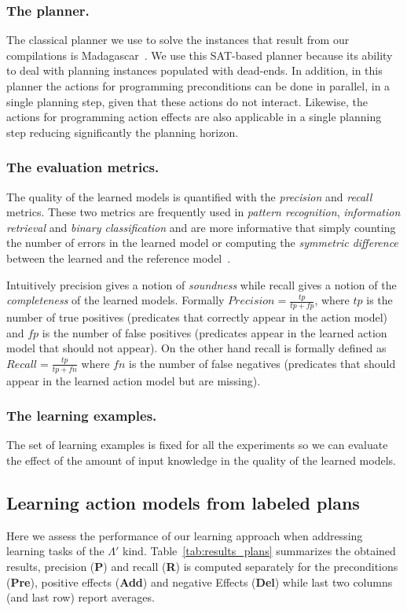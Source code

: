 \documentclass[letterpaper]{article} %
\begin{document}
\subsubsection{The planner.}
The classical planner we use to solve the instances that result from our compilations is {\sc Madagascar}~\cite{rintanen2014madagascar}. We use this SAT-based planner because its ability to deal with planning instances populated with dead-ends. In addition, in this planner the actions for programming preconditions can be done in parallel, in a single planning step, given that these actions do not interact. Likewise, the actions for programming action effects are also applicable in a single planning step reducing significantly the planning horizon.


\subsubsection{The evaluation metrics.}
The quality of the learned models is quantified with the {\em precision} and {\em recall} metrics. These two metrics are frequently used in {\em pattern recognition}, {\em information retrieval} and {\em binary classification} and are more informative that simply counting the number of errors in the learned model or computing the {\em symmetric difference} between the learned and the reference model~\cite{davis2006relationship}.

Intuitively precision gives a notion of {\em soundness} while recall gives a notion of the {\em completeness} of the learned models. Formally $Precision=\frac{tp}{tp+fp}$, where $tp$ is the number of true positives (predicates that correctly appear in the action model) and $fp$ is the number of false positives (predicates appear in the learned action model that should not appear). On the other hand recall is formally defined as $Recall=\frac{tp}{tp+fn}$ where $fn$ is the number of false negatives (predicates that should appear in the learned action model but are missing).

\subsubsection{The learning examples.}
The set of learning examples is fixed for all the experiments so we can evaluate the effect of the amount of input knowledge in the quality of the learned models. %

\subsection{Learning action models from labeled plans}
Here we assess the performance of our learning approach when addressing learning tasks of the $\Lambda'$ kind. Table~\ref{tab:results_plans} summarizes the obtained results, precision ({\bf P}) and recall ({\bf R}) is computed separately for the preconditions ({\bf Pre}), positive effects ({\bf Add}) and negative Effects ({\bf Del}) while last two columns (and last row) report averages. 
\end{document}
